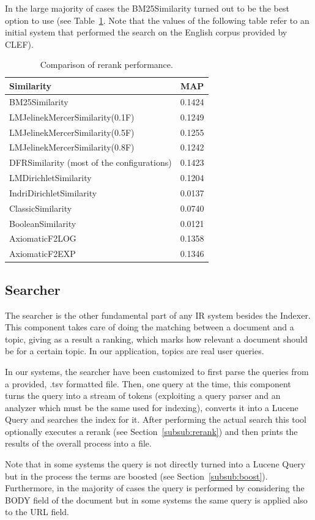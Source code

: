 In the large majority of cases the BM25Similarity turned out to be the best option to use (see Table~\ref{tab:similcomp}. Note that the values of the following table refer to an initial system that performed the search on the English corpus provided by CLEF).
\begin{center}
\begin{table}[tb]
\centering
\begin{tabular}{|l|c|} 
 \hline
    \textbf{Similarity} &  \textbf{MAP}  \\
 \hline\hline
 BM25Similarity & 0.1424  \\ 
 LMJelinekMercerSimilarity(0.1F) & 0.1249   \\
 LMJelinekMercerSimilarity(0.5F) & 0.1255  \\
 LMJelinekMercerSimilarity(0.8F) & 0.1242  \\ 
 DFRSimilarity (most of the configurations)& 0.1423\\
 LMDirichletSimilarity & 0.1204\\
 IndriDirichletSimilarity & 0.0137 \\
 ClassicSimilarity & 0.0740\\
 BooleanSimilarity & 0.0121 \\
 AxiomaticF2LOG & 0.1358 \\
 AxiomaticF2EXP & 0.1346\\
 \hline
\end{tabular}
\caption{Comparison of rerank performance.}
\label{tab:similcomp}
\end{table}
\end{center}

\subsection{Searcher}
\label{subsec:searcher}
The searcher is the other fundamental part of any IR system besides the Indexer. This component takes care of doing the matching between a document and a topic, giving as a result a ranking, which marks how relevant a document should be for a certain topic. In our application, topics are real user queries.
\par
In our systems, the searcher have been customized to first parse the queries from a provided, .tsv formatted file. Then, one query at the time, this component turns the query into a stream of tokens (exploiting a query parser and an analyzer which must be the same used for indexing), converts it into a Lucene Query and searches the index for it. After performing the actual search this tool optionally executes a rerank (see Section~\ref{subsub:rerank}) and then prints the results of the overall process into a file.
\par
Note that in some systems the query is not directly turned into a Lucene Query but in the process the terms are boosted (see Section~\ref{subsub:boost}). Furthermore, in the majority of cases the query is performed by considering the BODY field of the document but in some systems the same query is applied also to the URL field.

